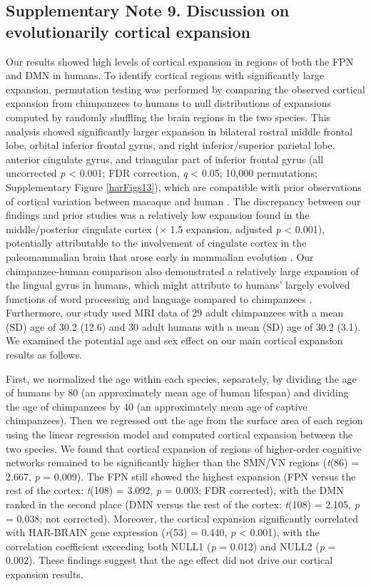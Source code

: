 \begin{refsection}
\subsection*{Supplementary Note 9. Discussion on evolutionarily cortical expansion}
Our results showed high levels of cortical expansion in regions of both the FPN and DMN in humans. To identify cortical regions with significantly large expansion, permutation testing was performed by comparing the observed cortical expansion from chimpanzees to humans to null distributions of expansions computed by randomly shuffling the brain regions in the two species. This analysis showed significantly larger expansion in bilateral rostral middle frontal lobe, orbital inferior frontal gyrus, and right inferior/superior parietal lobe, anterior cingulate gyrus, and triangular part of inferior frontal gyrus (all uncorrected \textit{p} < 0.001; FDR correction, \textit{q} < 0.05; 10,000 permutations; Supplementary Figure \ref{harFigs13}), which are compatible with prior observations of cortical variation between macaque and human \citep{donahue2018quantitative,hill2010similar}. The discrepancy between our findings and prior studies \citep{donahue2018quantitative,hill2010similar} was a relatively low expansion found in the middle/posterior cingulate cortex ($ \times $ 1.5 expansion, adjusted \textit{p} < 0.001), potentially attributable to the involvement of cingulate cortex in the paleomammalian brain that arose early in mammalian evolution \citep{Reiner1990TheTB}. Our chimpanzee-human comparison also demonstrated a relatively large expansion of the lingual gyrus in humans, which might attribute to humans’ largely evolved functions of word processing and language compared to chimpanzees \citep{Mechelli2000DifferentialEO}. Furthermore, our study used MRI data of 29 adult chimpanzees with a mean (SD) age of 30.2 (12.6) and 30 adult humans with a mean (SD) age of 30.2 (3.1). We examined the potential age and sex effect on our main cortical expansion results as follows.

First, we normalized the age within each species, separately, by dividing the age of humans by 80 (an approximately mean age of human lifespan) and dividing the age of chimpanzees by 40 (an approximately mean age of captive chimpanzees). Then we regressed out the age from the surface area of each region using the linear regression model and computed cortical expansion between the two species. We found that cortical expansion of regions of higher-order cognitive networks remained to be significantly higher than the SMN/VN regions (\textit{t}(86) = 2.667, \textit{p} = 0.009). The FPN still showed the highest expansion (FPN versus the rest of the cortex: \textit{t}(108) = 3.092, \textit{p} = 0.003; FDR corrected), with the DMN ranked in the second place (DMN versus the rest of the cortex: \textit{t}(108) = 2.105, \textit{p} = 0.038; not corrected). Moreover, the cortical expansion significantly correlated with HAR-BRAIN gene expression (\textit{r}(53) = 0.440, \textit{p} < 0.001), with the correlation coefficient exceeding both NULL1 (\textit{p} = 0.012) and NULL2 (\textit{p} = 0.002). These findings suggest that the age effect did not drive our cortical expansion results.


\end{refsection}
